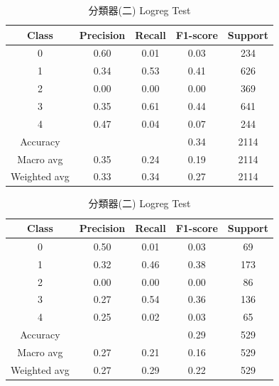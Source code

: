 \begin{enumerate}
\begin{enumerate}
                \begin{table}[H]
                \centering
                \scriptsize
                \begin{minipage}{0.48\textwidth}
                \centering
                \begin{tabular}{c|cccc}
                \hline
                Class & Precision & Recall & F1-score & Support \\
                \hline
                0 & 0.60 & 0.01 & 0.03 & 234 \\
                1 & 0.34 & 0.53 & 0.41 & 626 \\
                2 & 0.00 & 0.00 & 0.00 & 369 \\
                3 & 0.35 & 0.61 & 0.44 & 641 \\
                4 & 0.47 & 0.04 & 0.07 & 244 \\
                \hline
                Accuracy &       &      & 0.34 & 2114 \\
                Macro avg & 0.35 & 0.24 & 0.19 & 2114 \\
                Weighted avg & 0.33 & 0.34 & 0.27 & 2114 \\
                \hline
                \end{tabular}
                \caption{分類器(二) Logreg Train}
                \label{tab:classifier_2_report_train_logreg_logreg_non_filtered}
                \end{minipage}%
                \hfill
                \begin{minipage}{0.48\textwidth}
                \centering
                \begin{tabular}{c|cccc}
                \hline
                Class & Precision & Recall & F1-score & Support \\
                \hline
                0 & 0.50 & 0.01 & 0.03 & 69 \\
                1 & 0.32 & 0.46 & 0.38 & 173 \\
                2 & 0.00 & 0.00 & 0.00 & 86 \\
                3 & 0.27 & 0.54 & 0.36 & 136 \\
                4 & 0.25 & 0.02 & 0.03 & 65 \\
                \hline
                Accuracy &       &      & 0.29 & 529 \\
                Macro avg & 0.27 & 0.21 & 0.16 & 529 \\
                Weighted avg & 0.27 & 0.29 & 0.22 & 529 \\
                \hline
                \end{tabular}
                \caption{分類器(二) Logreg Test}
                \label{tab:classifier_2_report_test_logreg_logreg_non_filtered}
                \end{minipage}
                \end{table}


\end{enumerate}
\end{enumerate}
